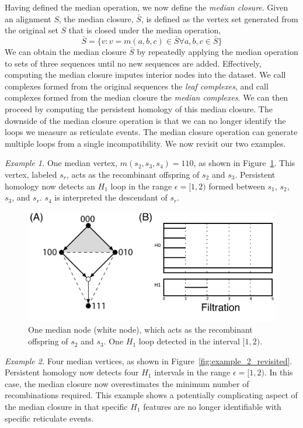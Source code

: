 Having defined the median operation, we now define the \emph{median closure}.
Given an alignment $S$, the median closure, $\bar{S}$, is defined as the vertex set generated from the original set $S$ that is closed under the median operation,
\begin{equation}
\bar{S} = \{v \colon v=m(a,b,c) \in \bar{S} \forall a,b,c \in \bar{S}\}
\end{equation}
We can obtain the median closure $\bar{S}$ by repeatedly applying the median operation to sets of three sequences until no new sequences are added.
Effectively, computing the median closure imputes interior nodes into the dataset.
We call complexes formed from the original sequences the \emph{leaf complexes}, and call complexes formed from the median closure the \emph{median complexes}.
We can then proceed by computing the persistent homology of this median closure.
The downside of the median closure operation is that we can no longer identify the loops we measure as reticulate events.
The median closure operation can generate multiple loops from a single incompatibility.
We now revisit our two examples.

\emph{Example 1.}
One median vertex, $m(s_2,s_3,s_4)=110$, as shown in Figure~\ref{fig:example_1_revisited}.
This vertex, labeled $s_r$, acts as the recombinant offspring of $s_2$ and $s_3$.
Persistent homology now detects an $H_{1}$ loop in the range $\epsilon=[1,2)$ formed between $s_1$, $s_2$, $s_3$, and $s_r$.
$s_4$ is interpreted the descendant of $s_r$.

\begin{figure}
\centering
\includegraphics[width=\columnwidth]{fig/complex_construction/example_1_revisited.pdf}
\caption{One median node (white node), which acts as the recombinant offspring of $s_2$ and $s_3$. One $H_1$ loop detected in the interval $[1,2)$.}
\label{fig:example_1_revisited}
\end{figure}

\emph{Example 2.}
Four median vertices, as shown in Figure~\ref{fig:example_2_revisited}.
Persistent homology now detects four $H_{1}$ intervals in the range $\epsilon=[1,2)$.
In this case, the median closure now overestimates the minimum number of recombinations required.
This example shows a potentially complicating aspect of the median closure in that specific $H_1$ features are no longer identifiable with specific reticulate events.

